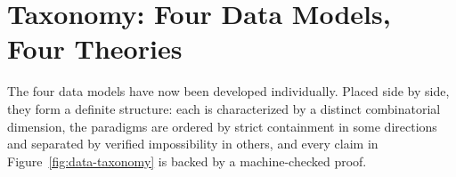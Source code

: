 
\section{Taxonomy: Four Data Models, Four Theories}
\label{sec:taxonomy}

The four data models have now been developed individually. Placed side by side, they form a definite structure: each is characterized by a distinct combinatorial dimension, the paradigms are ordered by strict containment in some directions and separated by verified impossibility in others, and every claim in Figure~\ref{fig:data-taxonomy} is backed by a machine-checked proof.

